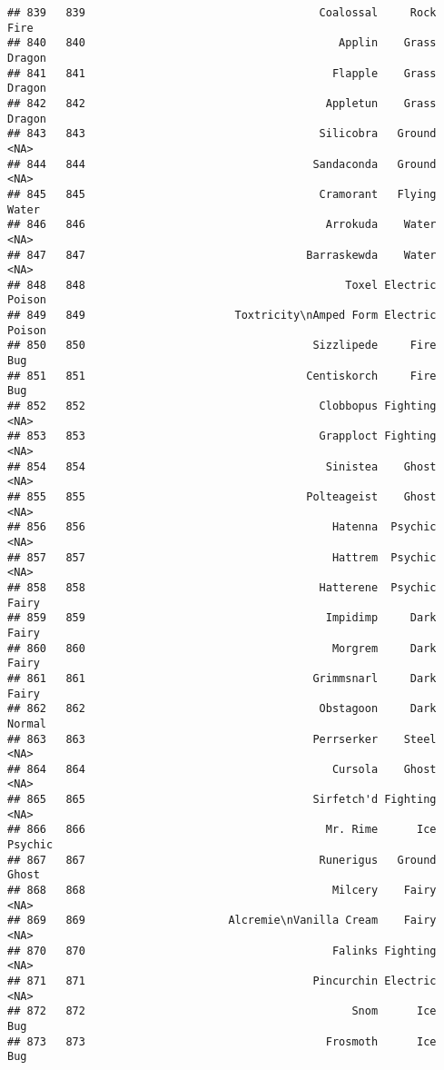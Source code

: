 \documentclass[
]{article}
\begin{document}
\begin{verbatim}
## 839   839                                    Coalossal     Rock     Fire
## 840   840                                       Applin    Grass   Dragon
## 841   841                                      Flapple    Grass   Dragon
## 842   842                                     Appletun    Grass   Dragon
## 843   843                                    Silicobra   Ground     <NA>
## 844   844                                   Sandaconda   Ground     <NA>
## 845   845                                    Cramorant   Flying    Water
## 846   846                                     Arrokuda    Water     <NA>
## 847   847                                  Barraskewda    Water     <NA>
## 848   848                                        Toxel Electric   Poison
## 849   849                       Toxtricity\nAmped Form Electric   Poison
## 850   850                                   Sizzlipede     Fire      Bug
## 851   851                                  Centiskorch     Fire      Bug
## 852   852                                    Clobbopus Fighting     <NA>
## 853   853                                    Grapploct Fighting     <NA>
## 854   854                                     Sinistea    Ghost     <NA>
## 855   855                                  Polteageist    Ghost     <NA>
## 856   856                                      Hatenna  Psychic     <NA>
## 857   857                                      Hattrem  Psychic     <NA>
## 858   858                                    Hatterene  Psychic    Fairy
## 859   859                                     Impidimp     Dark    Fairy
## 860   860                                      Morgrem     Dark    Fairy
## 861   861                                   Grimmsnarl     Dark    Fairy
## 862   862                                    Obstagoon     Dark   Normal
## 863   863                                   Perrserker    Steel     <NA>
## 864   864                                      Cursola    Ghost     <NA>
## 865   865                                   Sirfetch'd Fighting     <NA>
## 866   866                                     Mr. Rime      Ice  Psychic
## 867   867                                    Runerigus   Ground    Ghost
## 868   868                                      Milcery    Fairy     <NA>
## 869   869                      Alcremie\nVanilla Cream    Fairy     <NA>
## 870   870                                      Falinks Fighting     <NA>
## 871   871                                   Pincurchin Electric     <NA>
## 872   872                                         Snom      Ice      Bug
## 873   873                                     Frosmoth      Ice      Bug

\end{verbatim}
\end{document}
